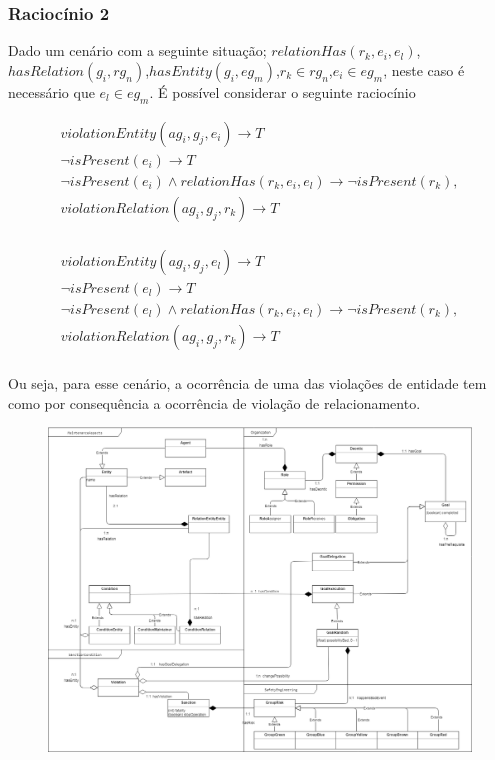 \documentclass[12pt]{article}
\begin{document}
\subsubsection{Raciocínio 2}

Dado um cenário com a seguinte situação; $relationHas(r_k,e_i,e_l)$,$hasRelation(g_i,rg_n)$,$hasEntity(g_i,eg_m)$,$r_k \in rg_n$,$e_i \in eg_m$, neste caso é necessário que $e_l \in eg_m$. É possível considerar o seguinte raciocínio

\begin{eqnarray}\label{raca2}
violationEntity(ag_i,g_j,e_i) \to T \nonumber \\
\neg isPresent(e_i) \to T  \nonumber \\ 
\neg isPresent(e_i) \wedge relationHas(r_k,e_i,e_l) \to \neg isPresent(r_k), \nonumber \\ 
violationRelation(ag_i,g_j,r_k) \to T \nonumber \\
\end{eqnarray}

\begin{eqnarray}\label{racb2}
violationEntity(ag_i,g_j,e_l) \to T \nonumber \\
\neg isPresent(e_l) \to T  \nonumber \\ 
\neg isPresent(e_l) \wedge relationHas(r_k,e_i,e_l) \to \neg isPresent(r_k), \nonumber \\ 
violationRelation(ag_i,g_j,r_k) \to T \nonumber \\
\end{eqnarray}

Ou seja, para esse cenário, a ocorrência de uma das violações de entidade tem como por consequência a ocorrência de violação de relacionamento. 

\begin{figure}
  \centering
  \includegraphics[width=0.8\linewidth]{umlmodel} 
\end{figure}




\end{document}
